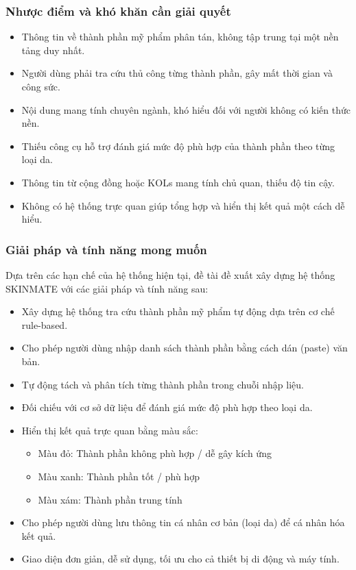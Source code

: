 \documentclass[12pt,a4paper]{article}
\begin{document}
\subsubsection{Nhược điểm và khó khăn cần giải quyết}

\begin{itemize}
    \item Thông tin về thành phần mỹ phẩm phân tán, không tập trung tại một nền tảng duy nhất.
    \item Người dùng phải tra cứu thủ công từng thành phần, gây mất thời gian và công sức.
    \item Nội dung mang tính chuyên ngành, khó hiểu đối với người không có kiến thức nền.
    \item Thiếu công cụ hỗ trợ đánh giá mức độ phù hợp của thành phần theo từng loại da.
    \item Thông tin từ cộng đồng hoặc KOLs mang tính chủ quan, thiếu độ tin cậy.
    \item Không có hệ thống trực quan giúp tổng hợp và hiển thị kết quả một cách dễ hiểu.
\end{itemize}

\subsubsection{Giải pháp và tính năng mong muốn}

Dựa trên các hạn chế của hệ thống hiện tại, đề tài đề xuất xây dựng hệ thống SKINMATE với các giải pháp và tính năng sau:

\begin{itemize}
    \item Xây dựng hệ thống tra cứu thành phần mỹ phẩm tự động dựa trên cơ chế rule-based.
    \item Cho phép người dùng nhập danh sách thành phần bằng cách dán (paste) văn bản.
    \item Tự động tách và phân tích từng thành phần trong chuỗi nhập liệu.
    \item Đối chiếu với cơ sở dữ liệu để đánh giá mức độ phù hợp theo loại da.
    \item Hiển thị kết quả trực quan bằng màu sắc:
    \begin{itemize}
        \item Màu đỏ: Thành phần không phù hợp / dễ gây kích ứng
        \item Màu xanh: Thành phần tốt / phù hợp
        \item Màu xám: Thành phần trung tính
    \end{itemize}
    \item Cho phép người dùng lưu thông tin cá nhân cơ bản (loại da) để cá nhân hóa kết quả.
    \item Giao diện đơn giản, dễ sử dụng, tối ưu cho cả thiết bị di động và máy tính.
\end{itemize}
\end{document}
